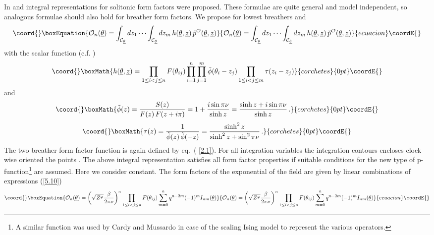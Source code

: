 \documentclass[a4paper,a4paper]{article}
\begin{document}
In \cite{BFKZ} and \cite{BK} integral representations for solitonic form
factors were proposed. These formulae are quite general and model
independent, so analogous formulae should also hold for breather form
factors. We propose for \coordHE{} lowest breathers and \coordHE{} 
\begin{equation}\coord{}\boxEquation{
\mathcal{O}_{n}(\underline{\theta })=\int_{\mathcal{C}_{\underline{\theta }
}}dz_{1}\cdots \int_{\mathcal{C}_{\underline{\theta }}}dz_{m}\,h(\underline{
\theta },{\underline{z}})\,\check{p}^{\mathcal{O}}(\underline{\theta },{
\underline{z}})  \label{5.10}
}{
\mathcal{O}_{n}(\underline{\theta })=\int_{\mathcal{C}_{\underline{\theta }
}}dz_{1}\cdots \int_{\mathcal{C}_{\underline{\theta }}}dz_{m}\,h(\underline{
\theta },{\underline{z}})\,\check{p}^{\mathcal{O}}(\underline{\theta },{
\underline{z}})  }{ecuacion}\coordE{}\end{equation}
with the scalar function (c.f. \cite{BFKZ}) 
\[\coord{}\boxMath{
h(\underline{\theta },{\underline{z}})=\prod_{1\le i<j\le n}F(\theta
_{ij})\prod_{i=1}^{n}\prod_{j=1}^{m}\tilde{\phi}(\theta
_{i}-z_{j})\prod_{1\le i<j\le m}\tau (z_{i}-z_{j}) 
}{corchetes}{0pt}\coordE{}\]
and 
\[\coord{}\boxMath{
\tilde{\phi}(z)=\frac{S(z)}{F(z)\,F(z+i\pi )}=1+\frac{i\sin \pi \nu }{\sinh z%
}=\frac{\sinh z+i\sin \pi \nu }{\sinh z}\,. 
}{corchetes}{0pt}\coordE{}\]
\[\coord{}\boxMath{
\tau (z)=\frac{1}{\tilde{\phi}(z)\,\tilde{\phi}(-z)}=\frac{\sinh ^{2}z}{%
\sinh ^{2}z+\sin ^{2}\pi \nu }\,. 
}{corchetes}{0pt}\coordE{}\]
The two breather form factor function \coordHE{} is again defined by eq.~(%
\ref{2.1}). For all integration variables \coordHE{}  \coordHE{} the
integration contours \coordHE{} encloses clock wise
oriented the points \coordHE{}. The above integral
representation satisfies all form factor properties if suitable conditions
for the new type of p-function\footnote{%
A similar function was used by Cardy and Mussardo \cite{CM} in case of the
scaling Ising model to represent the various operators.} \coordHE{} are assumed. Here we consider \coordHE{}
constant. The form factors of the exponential of the field \coordHE{} are given by linear combinations of
expressions (\ref{5.10}) 
\begin{equation}\coord{}\boxEquation{
\mathcal{O}_{n}(\underline{\theta })=\left( \sqrt{Z^{\varphi }}\frac{\beta }{
2\pi \nu }\right) ^{n}\prod_{1\leq i<j\leq n}F(\theta
_{ij})\sum_{m=0}^{n}q^{n-2m}(-1)^{m}I_{nm}(\underline{\theta })  \label{5.11}
}{
\mathcal{O}_{n}(\underline{\theta })=\left( \sqrt{Z^{\varphi }}\frac{\beta }{
2\pi \nu }\right) ^{n}\prod_{1\leq i<j\leq n}F(\theta
_{ij})\sum_{m=0}^{n}q^{n-2m}(-1)^{m}I_{nm}(\underline{\theta })  }{ecuacion}\coordE{}\end{equation}
\end{document}
